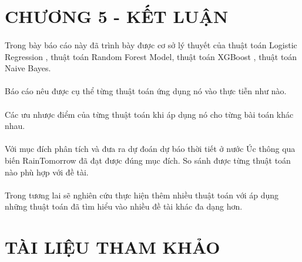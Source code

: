 \documentclass{article}
\begin{document}
\section*{CHƯƠNG 5 - KẾT LUẬN}
\setcounter{section}{5}
\setcounter{subsection}{0}
\paragraph{}Trong bày báo cáo này đã trình bày được cơ sở lý thuyết của  thuật toán Logistic Regression , thuật toán Random Forest Model, thuật toán XGBoost , thuật toán Naive Bayes. 
\paragraph{}Báo cáo nêu được cụ thể từng thuật toán ứng dụng nó vào thực tiễn như nào.
\paragraph{}Các ưu nhược điểm của từng thuật toán khi áp dụng nó cho từng bài toán khác nhau.
\paragraph{}Với mục đích phân tích và đưa ra dự đoán dự báo thời tiết ở nước Úc thông qua biến RainTomorrow đã đạt được đúng mục đích. So sánh được từng thuật toán nào phù hợp với đề tài.
\paragraph{}Trong tương lai sẽ nghiên cứu thực hiện thêm nhiều thuật toán với áp dụng những thuật toán đã tìm hiểu vào nhiều đề tài khác đa dạng hơn.
\pagebreak
\section*{TÀI LIỆU THAM KHẢO}
\setcounter{section}{5}
\setcounter{subsection}{0}
	\fontsize{13}{13}\selectfont
\end{document}
